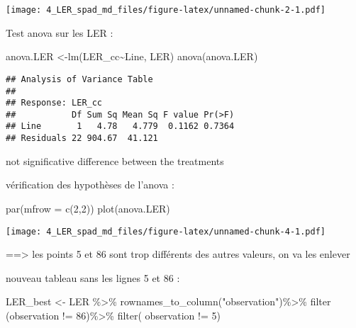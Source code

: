 \documentclass[
]{article}
\newenvironment{Shaded}{\begin{snugshade}}{\end{snugshade}}
\newcommand{\AttributeTok}[1]{\textcolor[rgb]{0.77,0.63,0.00}{#1}}
\newcommand{\DecValTok}[1]{\textcolor[rgb]{0.00,0.00,0.81}{#1}}
\newcommand{\FunctionTok}[1]{\textcolor[rgb]{0.00,0.00,0.00}{#1}}
\newcommand{\NormalTok}[1]{#1}
\newcommand{\OtherTok}[1]{\textcolor[rgb]{0.56,0.35,0.01}{#1}}
\newcommand{\SpecialCharTok}[1]{\textcolor[rgb]{0.00,0.00,0.00}{#1}}
\newcommand{\StringTok}[1]{\textcolor[rgb]{0.31,0.60,0.02}{#1}}
\begin{document}
\texttt{[image: 4\_LER\_spad\_md\_files/figure-latex/unnamed-chunk-2-1.pdf]}

Test anova sur les LER :

\begin{Shaded}
\begin{Highlighting}[]
\NormalTok{anova.LER }\OtherTok{\textless{}{-}}\FunctionTok{lm}\NormalTok{(LER\_cc}\SpecialCharTok{\textasciitilde{}}\NormalTok{Line, LER)}
\FunctionTok{anova}\NormalTok{(anova.LER)}
\end{Highlighting}
\end{Shaded}

\begin{verbatim}
## Analysis of Variance Table
## 
## Response: LER_cc
##           Df Sum Sq Mean Sq F value Pr(>F)
## Line       1   4.78   4.779  0.1162 0.7364
## Residuals 22 904.67  41.121
\end{verbatim}

not significative difference between the treatments

vérification des hypothèses de l'anova :

\begin{Shaded}
\begin{Highlighting}[]
\FunctionTok{par}\NormalTok{(}\AttributeTok{mfrow =} \FunctionTok{c}\NormalTok{(}\DecValTok{2}\NormalTok{,}\DecValTok{2}\NormalTok{))}
\FunctionTok{plot}\NormalTok{(anova.LER)}
\end{Highlighting}
\end{Shaded}

\texttt{[image: 4\_LER\_spad\_md\_files/figure-latex/unnamed-chunk-4-1.pdf]}

==\textgreater{} les points 5 et 86 sont trop différents des autres
valeurs, on va les enlever

nouveau tableau sans les lignes 5 et 86 :

\begin{Shaded}
\begin{Highlighting}[]
\NormalTok{LER\_best }\OtherTok{\textless{}{-}}\NormalTok{ LER }\SpecialCharTok{\%\textgreater{}\%}
  \FunctionTok{rownames\_to\_column}\NormalTok{(}\StringTok{"observation"}\NormalTok{)}\SpecialCharTok{\%\textgreater{}\%}
  \FunctionTok{filter}\NormalTok{ (observation }\SpecialCharTok{!=} \DecValTok{86}\NormalTok{)}\SpecialCharTok{\%\textgreater{}\%}
  \FunctionTok{filter}\NormalTok{( observation }\SpecialCharTok{!=} \DecValTok{5}\NormalTok{)}
\end{Highlighting}
\end{Shaded}
\end{document}
